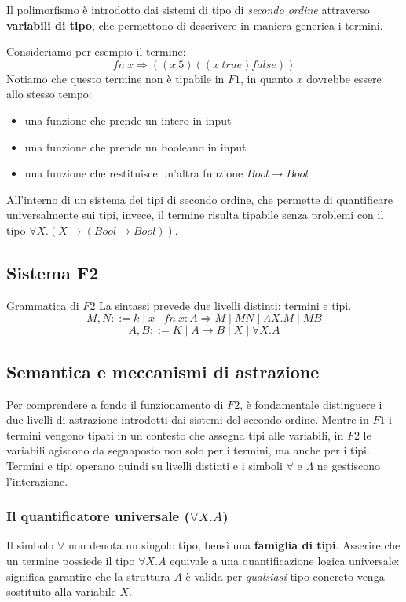 \documentclass[a4paper,11pt]{report}
\begin{document}
Il polimorfismo è introdotto dai sistemi di tipo di \textit{secondo ordine} attraverso \textbf{variabili di tipo}, che permettono di descrivere in maniera generica i termini.

Consideriamo per esempio il termine:
\[ fn \ x \Rightarrow ((x \ 5)((x \ true) false)) \]
Notiamo che questo termine non è tipabile in \( F1 \), in quanto \( x \) dovrebbe essere allo stesso tempo:
\begin{itemize}
    \item una funzione che prende un intero in input
    \item una funzione che prende un booleano in input
    \item una funzione che restituisce un'altra funzione \( Bool \to Bool \)
\end{itemize}

All'interno di un sistema dei tipi di secondo ordine, che permette di quantificare universalmente sui tipi, invece, il termine risulta tipabile senza problemi con il tipo \( \forall X.(X\to (Bool \to Bool)) \).

\subsection{Sistema F2}
\begin{defframe}{Grammatica di \( F2 \)}{}
    La sintassi prevede due livelli distinti: termini e tipi.
    \[ M, N ::= k \mid x \mid fn \ x : A \Rightarrow M \mid M N \mid \Lambda X.M \mid M B \]
    \[ A, B ::= K \mid A\to B \mid X \mid \forall X.A \]
\end{defframe}

    \subsection{Semantica e meccanismi di astrazione}

Per comprendere a fondo il funzionamento di \( F2 \), è fondamentale distinguere i due livelli di astrazione introdotti dai sistemi del secondo ordine.
Mentre in \( F1 \) i termini vengono tipati in un contesto che assegna tipi alle variabili, in \( F2 \) le variabili agiscono da segnaposto non solo per i termini, ma anche per i tipi.
Termini e tipi operano quindi su livelli distinti e i simboli $\forall$ e $\Lambda$ ne gestiscono l'interazione.

\subsubsection{Il quantificatore universale ($\forall X. A$)}
Il simbolo $\forall$ non denota un singolo tipo, bensì una \textbf{famiglia di tipi}.
Asserire che un termine possiede il tipo $\forall X. A$ equivale a una quantificazione logica universale: significa garantire che la struttura $A$ è valida per \textit{qualsiasi} tipo concreto venga sostituito alla variabile $X$.
\end{document}

